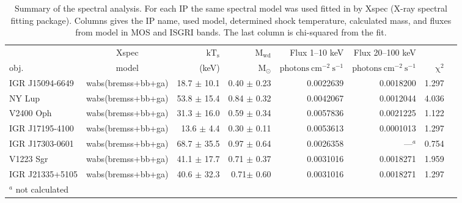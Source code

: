 \documentclass[oneside,a4paper,11pt]{report}
\begin{document}
\begin{table}
\begin{center}
\caption{Summary of the spectral analysis. For each IP the same spectral model was used fitted in by Xspec (X-ray spectral fitting package). Columns gives the IP name, used model, determined shock temperature, calculated mass, and fluxes from model in MOS and ISGRI bands. The last column is chi-squared from the fit.}
\begin{tabular}{lcrrrrrr}
\hline
\hline
     & Xspec & $\mathrm{kT_s}$& $\mathrm{M_{wd}}$   & Flux 1--10 keV                      & Flux 20--100 keV                      &         \\
obj. & model & (keV)          & $\mathrm{M_{\odot}}$& $\mathrm{photons\:cm^{-2}\:s^{-1}}$ & $\mathrm{photons\:cm^{-2}\:s^{-1}}$& $\mathrm{\chi}^2$         \\ 
\hline
IGR J15094-6649   &  wabs(bremss+bb+ga)& 18.7 $\pm$ 10.1  & 0.40  $\pm$ 0.23 &0.0022639&0.0018200&1.297 \\
NY Lup       & wabs(bremss+bb+ga) & 53.8 $\pm$ 15.4  & 0.84 $\pm$ 0.32&0.0042067 &0.0012044&4.036      \\
V2400 Oph      & wabs(bremss+bb+ga) &31.3 $\pm$ 16.0      &0.59 $\pm$ 0.34&0.0057836&0.0021225&      1.122      \\
IGR J17195-4100& wabs(bremss+bb+ga) &13.6 $\pm$ 4.4       & 0.30 $\pm$ 0.11&0.0053613&0.0001013& 1.297 \\
IGR J17303-0601& wabs(bremss+bb+ga) &68.7 $\pm$ 35.5      & 0.97 $\pm$ 0.64&0.0026358& ---$^a$&  0.754        \\
V1223 Sgr      & wabs(bremss+bb+ga) &41.1 $\pm$ 17.7      &0.71 $\pm$ 0.37&0.0031016&0.0018271&  1.959           \\
IGR J21335+5105&  wabs(bremss+bb+ga)&40.6 $\pm$ 32.3      &0.71$\pm$ 0.60&0.0031016& 0.0018271&        1.297        \\
\hline
\footnotesize
$^a$ not calculated& &&&&& \\
\hline
\end{tabular}
\end{center}
\end{table}
\end{document}
